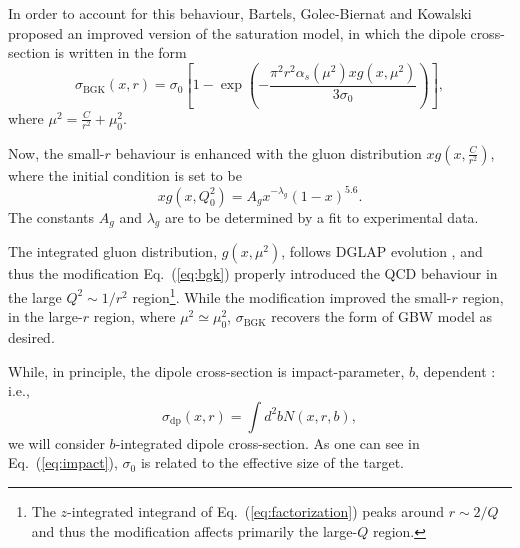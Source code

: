 \documentclass[11pt]{article}
\begin{document}
In order to account for this behaviour, Bartels, Golec-Biernat and Kowalski \cite{bgk2002} proposed an improved version of the saturation model, in which the dipole cross-section is written in the form
\begin{equation}
\sigma_{\mathrm{BGK}} (x,r)=\sigma_0 \left[ 1-\exp\left( - \frac{\pi^2 r^2\alpha_s(\mu^2) x g(x,\mu^2)}{3 \sigma_0} \right) \right],
\label{eq:bgk}
\end{equation}
where $\mu^2=\frac{C}{r^2} + \mu_0^2$.

Now, the small-$r$ behaviour is enhanced with the gluon distribution $x g(x, \frac{C}{r^2})$, where the initial condition is set to be \cite{bgk2002}
\begin{equation}
x g(x,Q_0^2)=A_g x^{-\lambda_g} (1-x)^{5.6}.
\end{equation}
The constants $A_g$ and $\lambda_g$ are to be determined by a fit to experimental data.

The integrated gluon distribution, $g(x,\mu^2)$, follows DGLAP evolution \cite{gbs2018},
and thus the modification Eq.~(\ref{eq:bgk}) properly introduced the QCD behaviour in the large $Q^2\sim1/r^2$ region\footnote{The $z$-integrated integrand of Eq.~(\ref{eq:factorization}) peaks around $r\sim2/Q$ and thus the modification affects primarily the large-$Q$ region. }. 
While the modification improved the small-$r$ region, %
in the large-$r$ region, where $\mu^2\simeq \mu_0^2$, $\sigma_{\mathrm{BGK}}$ recovers the form of GBW model as desired.  

{\color{blue}
While, in principle, the dipole cross-section is impact-parameter, $b$, dependent \cite{impact}:\\
i.e.,
\begin{equation}
\sigma_{\mathrm{dp}}(x,r)=\int d^2b N(x,r,b),
\label{eq:impact}
\end{equation} 
we will consider $b$-integrated dipole cross-section.
As one can see in Eq.~(\ref{eq:impact}), $\sigma_0$ is related to the effective size of the target.%
}

\end{document}
